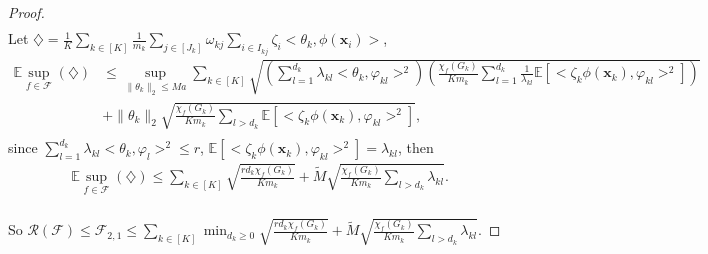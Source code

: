 \documentclass{article}
\def\vx{{\mathbf{x}}}
\def\eE{\mathbb{E}}
\begin{document}
\begin{proof}
\begin{align*}
\end{align*}
Let $\diamondsuit = \frac{1}{K} \sum _{k \in [K]} \frac{1}{m_k} \sum _{j \in [J_k]} \omega_{kj} \sum _{i \in I_{kj}} \zeta_i <\theta_k, \phi (\vx_i)> $,
\begin{align*}
    \eE \sup_{f \in \mathcal{F}} (\diamondsuit) & \leq \sup_{ \|\theta_k\|_2 \leq Ma } \sum _{k \in [K]} \sqrt{(\sum _{l=1}^{d_k} \lambda_{kl} <\theta_k, \varphi _{kl}>^2) (\frac{\chi_f(G_k)}{K m_k} \sum _{l=1}^{d_k} \frac{1}{\lambda _{kl}} \eE [< \zeta_k \phi (\vx_k), \varphi _{kl}>^2])} \\
    & + \|\theta_k\|_2 \sqrt{\frac{\chi_f(G_k)}{K m_k} \sum_{l > d_k} \eE[ < \zeta_k \phi (\vx_k), \varphi _{kl}>^2 ]}, \\
\end{align*}
since $\sum _{l=1}^{d_k} \lambda_{kl} <\theta_k, \varphi _l>^2 \leq r$,   $\eE [< \zeta_k \phi (\vx_k), \varphi _{kl}>^2] = \lambda_{kl}$, then
\begin{align*}
    \eE \sup_{f \in \mathcal{F}} (\diamondsuit) \leq \sum _{k \in [K]} \sqrt{\frac{r d_k \chi_f(G_k)}{K m_k}} + \widetilde{M} \sqrt{\frac{\chi_f(G_k)}{K m_k} \sum _{l > d_k} \lambda _{kl} }.\\
\end{align*}

So $\mathcal{R}(\mathcal{F}) \leq \mathcal{F}_{2,1} \leq \sum _{k \in [K]} \min _{d_k \geq 0} \sqrt{\frac{r d_k \chi_f(G_k)}{K m_k}} + \widetilde{M} \sqrt{\frac{\chi_f(G_k)}{K m_k} \sum _{l > d_k} \lambda _{kl}}$.
\end{proof}
\end{document}
